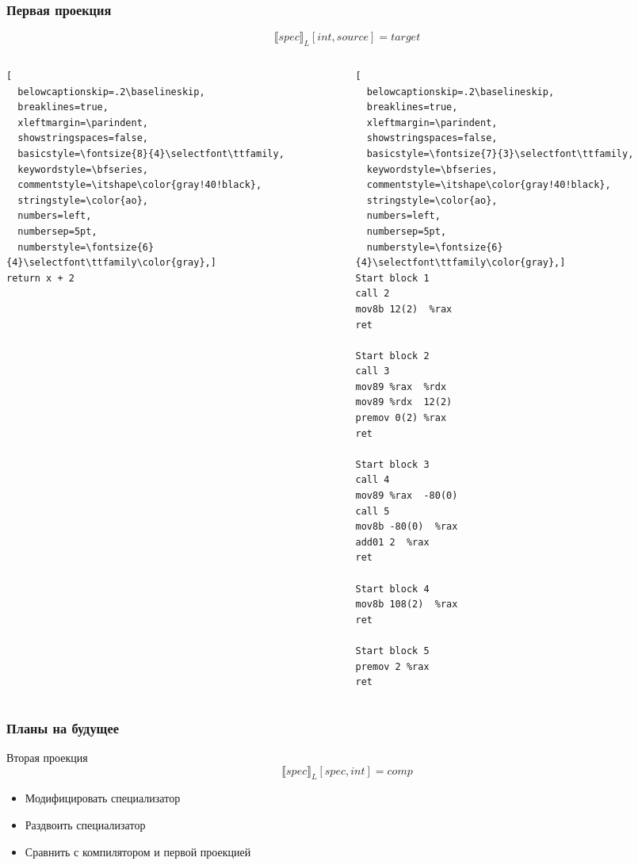\documentclass{beamer}
\begin{document}
\begin{frame}[fragile]\frametitle{Первая проекция}
\footnotesize{$$\llbracket spec \rrbracket_L [int, source] = target$$}
\begin{columns}
\begin{column}{0.5\textwidth}
\begin{lstlisting}[
  belowcaptionskip=.2\baselineskip,
  breaklines=true,
  xleftmargin=\parindent,
  showstringspaces=false,
  basicstyle=\fontsize{8}{4}\selectfont\ttfamily,
  keywordstyle=\bfseries,
  commentstyle=\itshape\color{gray!40!black},
  stringstyle=\color{ao},
  numbers=left,
  numbersep=5pt,
  numberstyle=\fontsize{6}{4}\selectfont\ttfamily\color{gray},]
return x + 2
\end{lstlisting}
\end{column}
\begin{column}{0.5\textwidth}
\begin{lstlisting}[
  belowcaptionskip=.2\baselineskip,
  breaklines=true,
  xleftmargin=\parindent,
  showstringspaces=false,
  basicstyle=\fontsize{7}{3}\selectfont\ttfamily,
  keywordstyle=\bfseries,
  commentstyle=\itshape\color{gray!40!black},
  stringstyle=\color{ao},
  numbers=left,
  numbersep=5pt,
  numberstyle=\fontsize{6}{4}\selectfont\ttfamily\color{gray},]
Start block 1
call 2
mov8b 12(2)  %rax 
ret

Start block 2
call 3
mov89 %rax  %rdx 
mov89 %rdx  12(2) 
premov 0(2) %rax 
ret

Start block 3
call 4
mov89 %rax  -80(0)
call 5
mov8b -80(0)  %rax 
add01 2  %rax
ret

Start block 4
mov8b 108(2)  %rax 
ret

Start block 5
premov 2 %rax 
ret
\end{lstlisting}
\end{column}
\end{columns}
\vfill
\end{frame}


\begin{frame}[fragile]\frametitle{Планы на будущее}
\vfill
Вторая проекция $$\llbracket spec \rrbracket_L [spec, int] = comp$$
\begin{itemize}
\vfill
\item Модифицировать специализатор
\vfill
\item Раздвоить специализатор
\vfill
\item Сравнить с компилятором и первой проекцией
\vfill
\end{itemize}
\end{frame}
\end{document}
